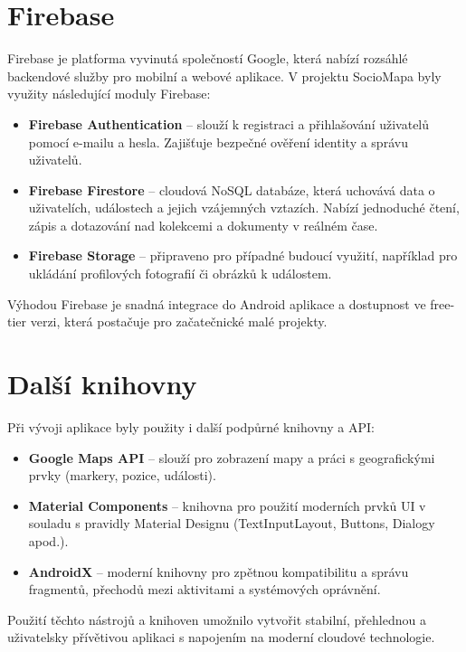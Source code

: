 \section{Firebase}

Firebase je platforma vyvinutá společností Google, která nabízí rozsáhlé backendové služby pro mobilní a webové aplikace. V projektu SocioMapa byly využity následující moduly Firebase:

\begin{itemize}
\item \textbf{Firebase Authentication} – slouží k registraci a přihlašování uživatelů pomocí e-mailu a hesla. Zajišťuje bezpečné ověření identity a správu uživatelů.
\item \textbf{Firebase Firestore} – cloudová NoSQL databáze, která uchovává data o uživatelích, událostech a jejich vzájemných vztazích. Nabízí jednoduché čtení, zápis a dotazování nad kolekcemi a dokumenty v reálném čase.
\item \textbf{Firebase Storage} – připraveno pro případné budoucí využití, například pro ukládání profilových fotografií či obrázků k událostem.
\end{itemize}

Výhodou Firebase je snadná integrace do Android aplikace a dostupnost ve free-tier verzi, která postačuje pro začatečnické malé projekty.

\section{Další knihovny}
\label{Další knihovny}

Při vývoji aplikace byly použity i další podpůrné knihovny a API:

\begin{itemize}
\item \textbf{Google Maps API} – slouží pro zobrazení mapy a práci s geografickými prvky (markery, pozice, události).
\item \textbf{Material Components} – knihovna pro použití moderních prvků UI v souladu s pravidly Material Designu (TextInputLayout, Buttons, Dialogy apod.).
\item \textbf{AndroidX} – moderní knihovny pro zpětnou kompatibilitu a správu fragmentů, přechodů mezi aktivitami a systémových oprávnění.
\end{itemize}

Použití těchto nástrojů a knihoven umožnilo vytvořit stabilní, přehlednou a uživatelsky přívětivou aplikaci s napojením na moderní cloudové technologie. 